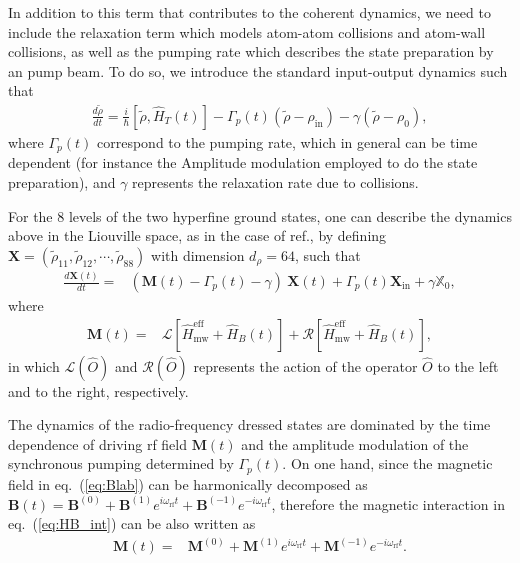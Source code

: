 \documentclass[%
reprint,
 amsmath,amssymb,
 aps,
floatfix,
]{revtex4-1}
\begin{document}
In addition to this term that contributes to the coherent dynamics, we need to include the relaxation term which models atom-atom collisions and atom-wall collisions, as well as the pumping rate which describes the state preparation by an pump beam. To do so, we introduce the standard input-output dynamics such that
\begin{align}
\frac{d\tilde{\rho} }{dt}=\frac{i}{\hbar}[\tilde{\rho},\hat{H}_{T}(t)]-\Gamma_p(t)(\tilde{\rho}-\rho_\mathrm{in}) - \gamma (\tilde{\rho}-\rho_{0}),
\end{align}
where $\Gamma_p(t)$ correspond to the pumping rate, which in general can be time dependent (for instance the Amplitude modulation employed to do the state preparation), and $\gamma$ represents the relaxation rate due to collisions.

For the 8 levels of the two hyperfine ground states,
 one can describe the dynamics above
 in the Liouville space, as in the case of ref.\cite{Floquet21}, by defining $\mathbf{X}=(\tilde{\rho}_{11},\tilde{\rho}_{12},\cdots,\tilde{\rho}_{88})$ with dimension $d_{\rho}=64$, such that 
\begin{align}
\frac{d\mathbf{X}(t)}{dt}=&(\mathbf{M}(t)-\Gamma_p(t)-\gamma)\ \mathbf{X}(t)+ \Gamma_{p} (t)\mathbf{X}_\mathrm{in}+\gamma\mathbb{X}_{0},\label{eq:Liouville_dyn}
\end{align}
where
\begin{align}
\mathbf{M}(t)=&\mathcal{L}[\hat{H}_{\mathrm{mw}}^{\mathrm{eff}}+\hat{H}_{B}(t)] +\mathcal{R}[\hat{H}_{\mathrm{mw}}^{\mathrm{eff}}+\hat{H}_{B}(t)],
\end{align}
in which $\mathcal{L}(\hat{O})$ and $\mathcal{R}(\hat{O})$ represents the action of the operator $\hat{O}$ to the left and to the right, respectively.

The dynamics of the radio-frequency dressed states are dominated by the 
time dependence of driving rf field $\mathbf{M}(t)$ and the amplitude modulation of the synchronous pumping determined by $\Gamma_p(t)$. On one hand, since the magnetic field in eq.~(\ref{eq:Blab}) can be harmonically decomposed as $\mathbf{B}(t)=\mathbf{B}^{(0)}+\mathbf{B}^{(1)} e^{i\omega_{\mathrm{rf}} t} +\mathbf{B}^{(-1)}e^{-i\omega_{\mathrm{rf}} t}$, therefore the magnetic interaction in eq.~(\ref{eq:HB_int})  can be also written as
\begin{align}
\mathbf{M}(t)=&\mathbf{M}^{(0)}+\mathbf{M}^{(1)}e^{i\omega_{\mathrm{rf}} t}+\mathbf{M}^{(-1)}e^{-i\omega_{\mathrm{rf}} t}.
\end{align}
\end{document}
